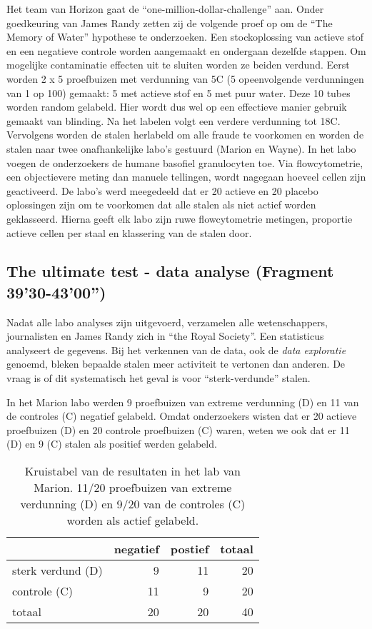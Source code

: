 \documentclass[12pt,dutch,coursenotes]{book}
\theoremstyle{definition}
\theoremstyle{definition}
\theoremstyle{definition}
\theoremstyle{remark}
\begin{document}
Het team van Horizon gaat de ``one-million-dollar-challenge'' aan. Onder
goedkeuring van James Randy zetten zij de volgende proef op om de ``The
Memory of Water'' hypothese te onderzoeken. Een stockoplossing van
actieve stof en een negatieve controle worden aangemaakt en ondergaan
dezelfde stappen. Om mogelijke contaminatie effecten uit te sluiten
worden ze beiden verdund. Eerst worden 2 x 5 proefbuizen met verdunning
van 5C (5 opeenvolgende verdunningen van 1 op 100) gemaakt: 5 met
actieve stof en 5 met puur water. Deze 10 tubes worden random gelabeld.
Hier wordt dus wel op een effectieve manier gebruik gemaakt van
blinding. Na het labelen volgt een verdere verdunning tot 18C.
Vervolgens worden de stalen herlabeld om alle fraude te voorkomen en
worden de stalen naar twee onafhankelijke labo's gestuurd (Marion en
Wayne). In het labo voegen de onderzoekers de humane basofiel
granulocyten toe. Via flowcytometrie, een objectievere meting dan
manuele tellingen, wordt nagegaan hoeveel cellen zijn geactiveerd. De
labo's werd meegedeeld dat er 20 actieve en 20 placebo oplossingen zijn
om te voorkomen dat alle stalen als niet actief worden geklasseerd.
Hierna geeft elk labo zijn ruwe flowcytometrie metingen, proportie
actieve cellen per staal en klassering van de stalen door.

\subsection{The ultimate test - data analyse (Fragment
39'30-43'00'')}\label{the-ultimate-test---data-analyse-fragment-3930-4300}

Nadat alle labo analyses zijn uitgevoerd, verzamelen alle
wetenschappers, journalisten en James Randy zich in ``the Royal
Society''. Een statisticus analyseert de gegevens. Bij het verkennen van
de data, ook de \emph{data exploratie} genoemd, bleken bepaalde stalen
meer activiteit te vertonen dan anderen. De vraag is of dit systematisch
het geval is voor ``sterk-verdunde'' stalen.

In het Marion labo werden 9 proefbuizen van extreme verdunning (D) en 11
van de controles (C) negatief gelabeld. Omdat onderzoekers wisten dat er
20 actieve proefbuizen (D) en 20 controle proefbuizen (C) waren, weten
we ook dat er 11 (D) en 9 (C) stalen als positief werden gelabeld.

\begin{table}[t]

\caption{\label{tab:kruistabelMarion}Kruistabel van de resultaten in het lab van Marion. 11/20 proefbuizen van extreme verdunning (D) en 9/20 van de controles (C) worden als actief gelabeld.}
\centering
\begin{tabular}{lrrr}
\toprule
  & negatief & postief & totaal\\
\midrule
sterk verdund (D) & 9 & 11 & 20\\
controle (C) & 11 & 9 & 20\\
totaal & 20 & 20 & 40\\
\bottomrule
\end{tabular}
\end{table}
\end{document}
